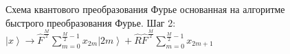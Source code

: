 \begin{figure}
\centering



\caption{Схема квантового преобразования Фурье основанная на алгоритме
быстрого преобразования Фурье. Шаг 2: 
$\left|x\right> \rightarrow
\hat{F}^{\frac{M}{2}} \sum_{m = 0}^{\frac{M}{2} - 1}x_{2m} \left|2m\right> +
\hat{R}\hat{F}^{\frac{M}{2}} \sum_{m = 0}^{\frac{M}{2} - 1} x_{2m + 1}$}
\label{figQuantCompQuantFourier2}
\end{figure}
